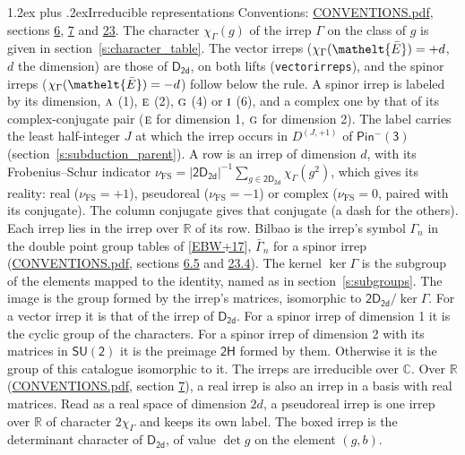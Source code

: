 \documentclass[10pt,a4paper]{article}
\makeatletter
\renewcommand\section{\@startsection{section}{1}{\z@}{-3ex plus -1ex minus -.2ex}%
  {1.2ex plus .2ex}{\normalfont\large\sffamily\bfseries\color{parttitle}}}
\numberwithin{equation}{section}
\newcommand{\eltfont}[1]{{\let\sigma\eltsigma\mathelt{#1}}}
\newcommand{\grp}[1]{\mathsf{#1}}
\newcommand{\irr}[1]{\text{\normalfont\scshape #1}}
\newcommand{\elt}[1]{\eltfont{#1}}
\newcommand{\irrJp}[2]{D^{(#1,#2)}}
\newcommand{\irchar}[1]{\chi_{#1}}
\newcommand{\fsind}{\nu_{\mathrm{FS}}}
\newcommand{\barred}[1]{\bar{#1}}
\makeatother
\begin{document}
\section{Irreducible representations}\label{s:irreps}
Conventions: \href{../../CONVENTIONS.pdf}{CONVENTIONS.pdf}, sections \href{../../../rotation/CONVENTIONS.pdf\#conv.6}{6}, \href{../../../rotation/CONVENTIONS.pdf\#conv.7}{7} and \href{../../CONVENTIONS.pdf\#conv.23}{23}.
\leavevmode\label{n:function.character}\label{n:irrep.Gamma}The character $\irchar{\Gamma}(g)$ of the irrep $\Gamma$ on the class of $g$ is given in section~\ref{s:character_table}. \label{n:index.dimension}The vector irreps ($\irchar{\Gamma}(\elt{\barred{E}}) = +d$, $d$ the dimension) are those of \href{../../../rotation/data/pdf/D2d.pdf}{$\grp{D_{2d}}$}, on both lifts (\texttt{vectorirreps}), and the spinor irreps ($\irchar{\Gamma}(\elt{\barred{E}}) = -d$) follow below the rule. A spinor irrep is labeled by its dimension, $\irr{a}$ (1), $\irr{e}$ (2), $\irr{g}$ (4) or $\irr{i}$ (6), and a complex one by that of its complex-conjugate pair ($\irr{e}$ for dimension 1, $\irr{g}$ for dimension 2). The label carries the least half-integer $J$ at which the irrep occurs in $\irrJp{J}{+1}$ of $\grp{Pin^{-}(3)}$ (section~\ref{s:subduction_parent}).
\leavevmode\label{n:index.frobenius}\label{n:head.irrep}\label{n:head.reality}A row is an irrep of dimension $d$, with its Frobenius--Schur indicator $\fsind = |\grp{2D_{2d}}|^{-1}\allowbreak\sum_{g\in\grp{2D_{2d}}}\irchar{\Gamma}(g^2)$, which gives its reality: real ($\fsind = +1$), pseudoreal ($\fsind = -1$) or complex ($\fsind = 0$, paired with its conjugate). \label{n:head.conjugate}The column conjugate gives that conjugate (a dash for the others). \label{n:head.over.real}Each irrep lies in the irrep over $\mathbb{R}$ of its row. \label{n:head.bilbao}\label{n:irrep.alias.gamma}Bilbao is the irrep's symbol $\Gamma_n$ in the double point group tables of [\href{../../../REFERENCES.pdf\#ref.EBW+17}{EBW+17}], $\bar{\Gamma}_n$ for a spinor irrep (\href{../../CONVENTIONS.pdf}{CONVENTIONS.pdf}, sections \href{../../../rotation/CONVENTIONS.pdf\#conv.6.5}{6.5} and \href{../../CONVENTIONS.pdf\#conv.23.4}{23.4}). \label{n:head.kernel}The kernel $\ker\Gamma$ is the subgroup of the elements mapped to the identity, named as in section~\ref{s:subgroups}. \label{n:head.image}The image is the group formed by the irrep's matrices, isomorphic to $\grp{2D_{2d}}/\ker\Gamma$. For a vector irrep it is that of the irrep of \href{../../../rotation/data/pdf/D2d.pdf}{$\grp{D_{2d}}$}. For a spinor irrep of dimension 1 it is the cyclic group of the characters. For a spinor irrep of dimension 2 with its matrices in $\grp{SU(2)}$ it is the preimage $\grp{2H}$ formed by them. Otherwise it is the group of this catalogue isomorphic to it. The irreps are irreducible over $\mathbb{C}$. Over $\mathbb{R}$ (\href{../../CONVENTIONS.pdf}{CONVENTIONS.pdf}, section \href{../../../rotation/CONVENTIONS.pdf\#conv.7}{7}), a real irrep is also an irrep in a basis with real matrices. Read as a real space of dimension $2d$, a pseudoreal irrep is one irrep over $\mathbb{R}$ of character $2\irchar{\Gamma}$ and keeps its own label. \label{n:mark.determinant}The boxed irrep is the determinant character of \href{../../../rotation/data/pdf/D2d.pdf}{$\grp{D_{2d}}$}, of value $\det g$ on the element $(g, b)$.
\end{document}

